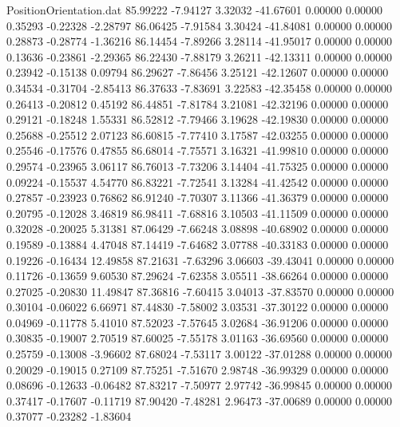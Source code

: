 \begin{filecontents}{PositionOrientation.dat}
  85.99222   -7.94127    3.32032   -41.67601    0.00000    0.00000    0.35293   -0.22328   -2.28797
  86.06425   -7.91584    3.30424   -41.84081    0.00000    0.00000    0.28873   -0.28774   -1.36216
  86.14454   -7.89266    3.28114   -41.95017    0.00000    0.00000    0.13636   -0.23861   -2.29365
  86.22430   -7.88179    3.26211   -42.13311    0.00000    0.00000    0.23942   -0.15138    0.09794
  86.29627   -7.86456    3.25121   -42.12607    0.00000    0.00000    0.34534   -0.31704   -2.85413
  86.37633   -7.83691    3.22583   -42.35458    0.00000    0.00000    0.26413   -0.20812    0.45192
  86.44851   -7.81784    3.21081   -42.32196    0.00000    0.00000    0.29121   -0.18248    1.55331
  86.52812   -7.79466    3.19628   -42.19830    0.00000    0.00000    0.25688   -0.25512    2.07123
  86.60815   -7.77410    3.17587   -42.03255    0.00000    0.00000    0.25546   -0.17576    0.47855
  86.68014   -7.75571    3.16321   -41.99810    0.00000    0.00000    0.29574   -0.23965    3.06117
  86.76013   -7.73206    3.14404   -41.75325    0.00000    0.00000    0.09224   -0.15537    4.54770
  86.83221   -7.72541    3.13284   -41.42542    0.00000    0.00000    0.27857   -0.23923    0.76862
  86.91240   -7.70307    3.11366   -41.36379    0.00000    0.00000    0.20795   -0.12028    3.46819
  86.98411   -7.68816    3.10503   -41.11509    0.00000    0.00000    0.32028   -0.20025    5.31381
  87.06429   -7.66248    3.08898   -40.68902    0.00000    0.00000    0.19589   -0.13884    4.47048
  87.14419   -7.64682    3.07788   -40.33183    0.00000    0.00000    0.19226   -0.16434   12.49858
  87.21631   -7.63296    3.06603   -39.43041    0.00000    0.00000    0.11726   -0.13659    9.60530
  87.29624   -7.62358    3.05511   -38.66264    0.00000    0.00000    0.27025   -0.20830   11.49847
  87.36816   -7.60415    3.04013   -37.83570    0.00000    0.00000    0.30104   -0.06022    6.66971
  87.44830   -7.58002    3.03531   -37.30122    0.00000    0.00000    0.04969   -0.11778    5.41010
  87.52023   -7.57645    3.02684   -36.91206    0.00000    0.00000    0.30835   -0.19007    2.70519
  87.60025   -7.55178    3.01163   -36.69560    0.00000    0.00000    0.25759   -0.13008   -3.96602
  87.68024   -7.53117    3.00122   -37.01288    0.00000    0.00000    0.20029   -0.19015    0.27109
  87.75251   -7.51670    2.98748   -36.99329    0.00000    0.00000    0.08696   -0.12633   -0.06482
  87.83217   -7.50977    2.97742   -36.99845    0.00000    0.00000    0.37417   -0.17607   -0.11719
  87.90420   -7.48281    2.96473   -37.00689    0.00000    0.00000    0.37077   -0.23282   -1.83604

\end{filecontents}
